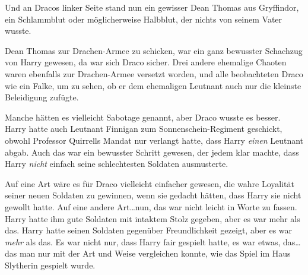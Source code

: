 Und an Dracos linker Seite stand nun ein gewisser Dean Thomas aus Gryffindor, ein Schlammblut oder möglicherweise Halbblut, der nichts von seinem Vater wusste.

Dean Thomas zur Drachen-Armee zu schicken, war ein ganz bewusster Schachzug von Harry gewesen, da war sich Draco sicher. Drei andere ehemalige Chaoten waren ebenfalls zur Drachen-Armee versetzt worden, und alle beobachteten Draco wie ein Falke, um zu sehen, ob er dem ehemaligen Leutnant auch nur die kleinste Beleidigung zufügte.

Manche hätten es vielleicht Sabotage genannt, aber Draco wusste es besser. Harry hatte auch Leutnant Finnigan zum Sonnenschein-Regiment geschickt, obwohl Professor Quirrells Mandat nur verlangt hatte, dass Harry \emph{einen} Leutnant abgab. Auch das war ein bewusster Schritt gewesen, der jedem klar machte, dass Harry \emph{nicht} einfach seine schlechtesten Soldaten ausmusterte.

Auf eine Art wäre es für Draco vielleicht einfacher gewesen, die wahre Loyalität seiner neuen Soldaten zu gewinnen, wenn sie gedacht hätten, dass Harry sie nicht gewollt hatte. Auf eine andere Art…nun, das war nicht leicht in Worte zu fassen. Harry hatte ihm gute Soldaten mit intaktem Stolz gegeben, aber es war mehr als das. Harry hatte seinen Soldaten gegenüber Freundlichkeit gezeigt, aber es war \emph{mehr} als das. Es war nicht nur, dass Harry fair gespielt hatte, es war etwas, das… das man nur mit der Art und Weise vergleichen konnte, wie das Spiel im Haus Slytherin gespielt wurde.

